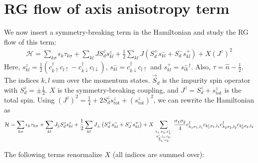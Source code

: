 \documentclass[12pt]{revtex4-2}
\begin{document}
\section{RG flow of axis anisotropy term}
We now insert a symmetry-breaking term in the Hamiltonian and study the RG flow of this term:
\begin{equation}\begin{aligned}
	\mathcal{H} = \sum_{k\sigma}\epsilon_{k}\tau_{k\sigma} + \sum_{kl} J S_d^z s^z_{kl} + \frac{1}{2}\sum_{kl} J \left(S_d^+ s^-_{kl}  + S_d^- s^+_{kl}\right) + X \left(J^z\right)^2
\end{aligned}\end{equation}
Here, \(s^z_{kl} = \frac{1}{2}\left(c^\dagger_{k\uparrow}c_{l \uparrow} - c^\dagger_{k\downarrow}c_{l \downarrow}\right)\), \(s^-_{kl} = c^\dagger_{k \downarrow}c_{l \uparrow}\) and \(s^+_{kl} = {s^-_{lk}}^\dagger\). Also, \(\tau = \hat n - \frac{1}{2}\). The indices \(k,l\) sum over the momentum states. \(\vec S_d\) is the impurity spin operator with \(S_d^z = \pm \frac{1}{2}\). \(X\) is the symmetry-breaking coupling, and \(J^z = S_d^z + s^z_\text{tot}\) is the total spin. Using \(\left(J^z\right)^2 = \frac{1}{4} + 2S_d^z s^z_\text{tot} + \left(s^z_\text{tot}\right)^2 \), we can rewrite the Hamiltonian as
\begin{equation}\begin{aligned}
	\mathcal{H} = \sum_{k\sigma}\epsilon_{k}\tau_{k\sigma} + \sum_{kl} J_\parallel S_d^z s^z_{kl} + \frac{1}{2}\sum_{kl} J_\perp \left(S_d^+ s^-_{kl}  + S_d^- s^+_{kl}\right) + X \sum_{k_1,k_2,k_1^\prime,\atop{k_2^\prime,l_1,l_2,\atop{\sigma_1,\sigma_2}}}\frac{\sigma_1\sigma_2}{4} c^\dagger_{k_1\sigma_1,l_1}c_{k_1^\prime\sigma_1,l_1}c^\dagger_{k_2\sigma_2,l_2}c_{k_2^\prime\sigma_2,l_2}
\end{aligned}\end{equation}

The following terms renormalize \(X\) (all indices are summed over):
\end{document}
